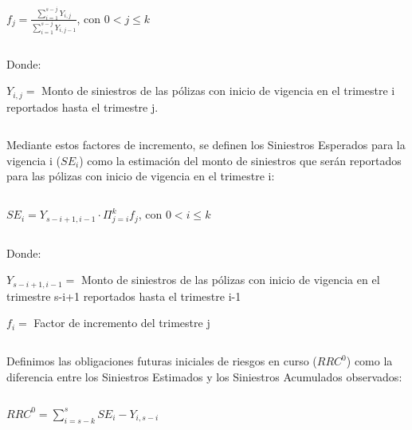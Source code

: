 \documentclass[11pt,twoside,openright,spanish]{report}
\numberwithin{equation}{chapter}
\numberwithin{figure}{chapter}
\numberwithin{table}{chapter}
\begin{document}
	\doublespacing

$ $

\doublespacing
	
	
	{\centering
	${f}_{j}=\frac{\sum _{i=1}^{s-j}{Y}_{i,j}}{\sum _{i=1}^{s-j}{Y}_{i,j-1}}$, con $0< j\le k$
	\noindent
	
}	

	\doublespacing

$ $

\doublespacing

	Donde:
	
	${Y}_{i,j}=$ Monto de siniestros de las pólizas con inicio de vigencia en el trimestre i reportados hasta el trimestre j.

	\doublespacing

$ $

\doublespacing

Mediante estos factores de incremento, se definen los Siniestros Esperados para la vigencia i (${SE}_{i}$) como la estimación del monto de siniestros que serán reportados para las pólizas con inicio de vigencia en el trimestre i:
	
	\doublespacing

$ $

\doublespacing

		{\centering
		${SE}_{i}={Y}_{s-i+1,i-1}\cdot\Pi_{j=i}^{k}{f}_{j}$, con $0< i\le k$
		\noindent
		
	}	
	
	
	\doublespacing

$ $

\doublespacing

	Donde:
	
		${Y}_{s-i+1,i-1}=$ Monto de siniestros de las pólizas con inicio de vigencia en el trimestre s-i+1 reportados hasta el trimestre i-1
	
	${f}_{i}=$ Factor de incremento del trimestre j

	\doublespacing

$ $

\doublespacing

	Definimos las obligaciones futuras iniciales de riesgos en curso (${RRC}_{}^{0}$) como la diferencia entre los Siniestros Estimados y los Siniestros Acumulados observados:
	
	\doublespacing

$ $

\doublespacing
	
	
	{\centering
		${RRC}_{}^{0}=\sum _{i=s-k}^{s}{SE}_{i}-{Y}_{i,s-i}$
		
	}
	
\end{document}
